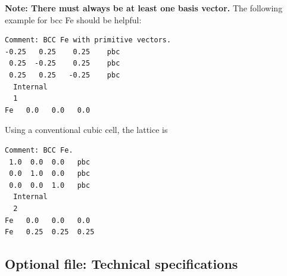 \documentclass[a4paper,12pt,pdftex,onecolumn]{article}
\begin{document}
\textbf{Note: There must always be at least one basis vector.}
The following example for bcc Fe should be helpful:

\begin{Verbatim}[fontsize=\relsize{-1},frame=single]
Comment: BCC Fe with primitive vectors.
-0.25   0.25    0.25    pbc
 0.25  -0.25    0.25    pbc
 0.25   0.25   -0.25    pbc
  Internal
  1
Fe   0.0   0.0   0.0
\end{Verbatim}

Using a conventional cubic cell, the lattice is

\begin{Verbatim}[fontsize=\relsize{-1},frame=single]
Comment: BCC Fe.
 1.0  0.0  0.0   pbc
 0.0  1.0  0.0   pbc
 0.0  0.0  1.0   pbc
  Internal
  2
Fe   0.0   0.0   0.0
Fe   0.25  0.25  0.25
\end{Verbatim}







\subsection{Optional file: Technical specifications}
\end{document}
